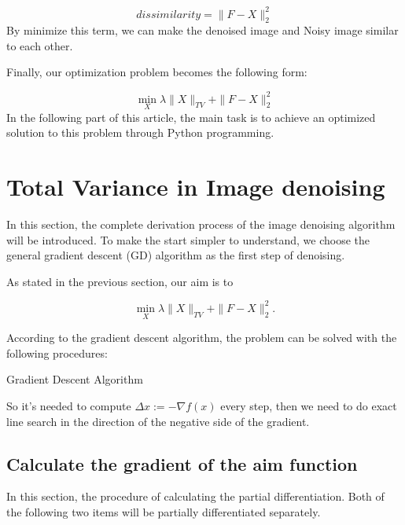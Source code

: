 \documentclass{article}
\makeatletter
\def\BState{\State\hskip-\ALG@thistlm}
\makeatother
\begin{document}
$$
dissimilarity = \|F-X\|_{2}^{2}
$$
By minimize this term, we can make the denoised image and Noisy image similar to each other.

Finally, our optimization problem becomes the following form:

$$
\min _{X} \lambda\|X\|_{T V}+\|F-X\|_{2}^{2}
$$
In the following part of this article, the main task is to achieve an optimized solution to this problem through Python programming.


\section{Total Variance in Image denoising}

In this section, the complete derivation process of the image denoising algorithm will be introduced. To make the start simpler to understand, we choose the general gradient descent (GD) algorithm as the first step of denoising.

As stated in the previous section, our aim is to

$$
\min _{X} \lambda\|X\|_{T V}+\|F-X\|_{2}^{2}.
$$

According to the gradient descent algorithm, the problem can be solved with the following procedures:

\begin{algorithm}
\caption{Gradient Descent Algorithm}\label{alg1}
\end{algorithm}

So it's needed to compute $\Delta x:=-\nabla f(x)$ every step, then we need to do exact line search in the direction of the negative side of the gradient.

\subsection{Calculate the gradient of the aim function}

In this section, the procedure of calculating the partial differentiation. Both of the following two items will be partially differentiated separately.
\end{document}
